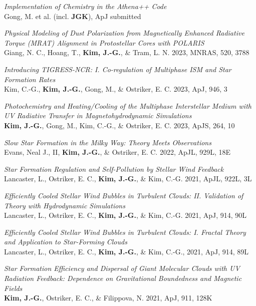 \begin{benumerate}{20}
\item \textit{Implementation of Chemistry in the Athena++ Code} \\ Gong, M. et al. (incl.
\textbf{JGK}), ApJ submitted
\item \textit{Physical Modeling of Dust Polarization from Magnetically Enhanced Radiative
    Torque (MRAT) Alignment in Protostellar Cores with POLARIS} \\ Giang, N. C., Hoang,
  T., \textbf{Kim, J.-G.}, \& Tram, L. N. 2023, MNRAS, 520, 3788
\item \textit{Introducing TIGRESS-NCR: I. Co-regulation of Multiphase ISM and
Star Formation Rates} \\ Kim, C.-G., \textbf{Kim, J.-G.}, Gong, M., \& Ostriker,
E. C. 2023, ApJ, 946, 3
\item \textit{Photochemistry and Heating/Cooling of the Multiphase Interstellar
Medium with UV Radiative Transfer in Magnetohydrodynamic Simulations} \\
\textbf{Kim, J.-G.}, Gong, M., Kim, C.-G., \& Ostriker, E. C. 2023, ApJS, 264, 10
\item \textit{Slow Star Formation in the Milky Way: Theory Meets Observations}\\
  Evans, Neal J., II, \textbf{Kim, J.-G.}, \& Ostriker, E. C. 2022, ApJL, 929L,
  18E
\item \textit{Star Formation Regulation and Self-Pollution by Stellar Wind
    Feedback}\\
  Lancaster, L., Ostriker, E. C., \textbf{Kim, J.-G.}, \& Kim, C.-G. 2021, ApJL,
  922L, 3L
\item \textit{Efficiently Cooled Stellar Wind Bubbles in Turbulent Clouds:
    II. Validation of Theory with Hydrodynamic Simulations}\\
  Lancaster, L., Ostriker, E. C., \textbf{Kim, J.-G.}, \& Kim, C.-G. 2021, ApJ,
  914, 90L
\item \textit{Efficiently Cooled Stellar Wind Bubbles in Turbulent Clouds:
I. Fractal Theory and Application to Star-Forming Clouds}\\
  Lancaster, L., Ostriker, E. C., \textbf{Kim, J.-G.}, \& Kim, C.-G., 2021, ApJ,
914, 89L
\item \textit{Star Formation Efficiency and Dispersal of Giant Molecular
    Clouds with UV Radiation Feedback: Dependence on Gravitational Boundedness
    and Magnetic Fields} \\ \textbf{Kim, J.-G.}, Ostriker, E. C., \& Filippova,
  N. 2021, ApJ, 911, 128K

\end{benumerate}
